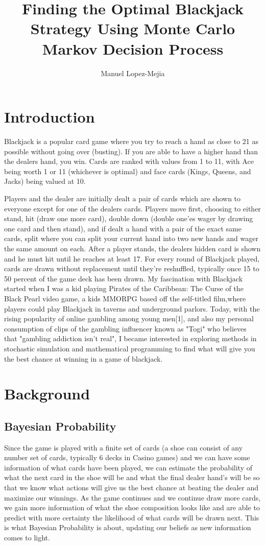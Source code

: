 \documentclass[12pt,a4paper]{cibb}
\title{\Large $\ $\\ \bf Finding the Optimal Blackjack Strategy Using Monte Carlo Markov Decision Process}
\author{\large Manuel Lopez-Mejia}
\begin{document}
\thispagestyle{myheadings}
\pagestyle{myheadings}


\section{Introduction}
\label{sec:SCIENTIFIC-BACKGROUND}

Blackjack is a popular card game where you try to reach a hand as close to 21 as possible without going over (busting).
If you are able to have a higher hand than the dealers hand, you win. 
Cards are ranked with values from 1 to 11, with Ace being worth 1 or 11 (whichever is optimal) and face cards (Kings, Queens, and Jacks) being valued at 10. 

Players and the dealer are initially dealt a pair of cards which are shown to everyone except for one of the dealers cards.
Players move first, choosing to either stand, hit (draw one more card), double down (double one'es wager by drawing one card and then stand), and if dealt a hand with a pair of the exact same cards, split where you can split your current hand into two new hands and wager the same amount on each. 
After a player stands, the dealers hidden card is shown and he must hit until he reaches at least 17. For every round of Blackjack played, cards are drawn without replacement until they're reshuffled, typically once 15 to 50 percent of the game deck has been drawn. 
My fascination with Blackjack started when I was a kid playing Pirates of the Caribbean: The Curse of the Black Pearl video game, a kids MMORPG based off the self-titled film,where players could play Blackjack in taverns and underground parlors.
Today, with the rising popularity of online gambling among young men[1], and also my personal consumption of clips of the gambling influencer known as "Togi" who believes that "gambling addiction isn't real", I became interested in exploring methods in stochastic simulation and mathematical programming to find what will give you the best chance at winning in a game of blackjack. 

\section{Background}
\label{sec:Theory}

\subsection{Bayesian Probability}

Since the game is played with a finite set of cards (a shoe can consist of any number set of cards, typically 6 decks in Casino games) and we can have some information of what cards have been played, we can estimate the probability of what the next card in the shoe will be and what the final dealer hand's will be so that we know what actions will give us the best chance at beating the dealer and maximize our winnings.
As the game continues and we continue draw more cards, we gain more information of what the shoe composition looks like and are able to predict with more certainty the likelihood of what cards will be drawn next.
This is what Bayesian Probability is about, updating our beliefs as new information comes to light. 
\end{document}
